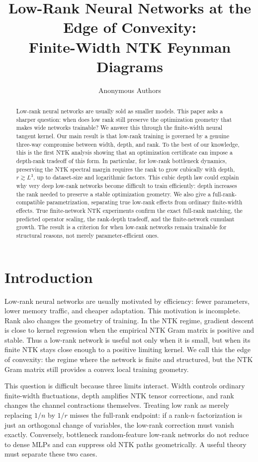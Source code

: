 \documentclass{article}
\title{Low-Rank Neural Networks at the Edge of Convexity:\\
Finite-Width NTK Feynman Diagrams}
\author{Anonymous Authors}
\begin{document}
\maketitle

\begin{abstract}
Low-rank neural networks are usually sold as smaller models. This paper asks a sharper question: when does low rank still preserve the optimization geometry that makes wide networks trainable? We answer this through the finite-width neural tangent kernel. Our main result is that low-rank training is governed by a genuine three-way compromise between width, depth, and rank. To the best of our knowledge, this is the first NTK analysis showing that an optimization certificate can impose a depth-rank tradeoff of this form. In particular, for low-rank bottleneck dynamics, preserving the NTK spectral margin requires the rank to grow cubically with depth, \(r \gtrsim L^{3}\), up to dataset-size and logarithmic factors. This cubic depth law could explain why very deep low-rank networks become difficult to train efficiently: depth increases the rank needed to preserve a stable optimization geometry. We also give a full-rank-compatible parametrization, separating true low-rank effects from ordinary finite-width effects. True finite-network NTK experiments confirm the exact full-rank matching, the predicted operator scaling, the rank-depth tradeoff, and the finite-network cumulant growth. The result is a criterion for when low-rank networks remain trainable for structural reasons, not merely parameter-efficient ones.
\end{abstract}

\section{Introduction}
Low-rank neural networks are usually motivated by efficiency: fewer parameters, lower memory traffic, and cheaper adaptation. This motivation is incomplete. Rank also changes the geometry of training. In the NTK regime, gradient descent is close to kernel regression when the empirical NTK Gram matrix is positive and stable. Thus a low-rank network is useful not only when it is small, but when its finite NTK stays close enough to a positive limiting kernel. We call this the edge of convexity: the regime where the network is finite and structured, but the NTK Gram matrix still provides a convex local training geometry.

This question is difficult because three limits interact. Width controls ordinary finite-width fluctuations, depth amplifies NTK tensor corrections, and rank changes the channel contractions themselves. Treating low rank as merely replacing \(1/n\) by \(1/r\) misses the full-rank endpoint: if a rank-\(n\) factorization is just an orthogonal change of variables, the low-rank correction must vanish exactly. Conversely, bottleneck random-feature low-rank networks do not reduce to dense MLPs and can suppress old NTK paths geometrically. A useful theory must separate these two cases.
\end{document}
